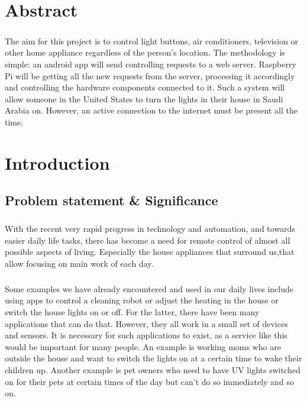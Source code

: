 \documentclass[12pt, oneside, a4paper]{book}
\newcommand{\mychapter}[1]{\newpage%
	\thispagestyle{empty}
	\topskip0pt%
	\vspace*{\fill}%
	\addtocounter{chapter}{1}%
	\begin{center}%
		\textbf{\Large{\color{chapter}{CHAPTER NO. \thechapter \\ \uppercase{#1}}}}%
	\end{center}%
	\vspace*{\fill}%
	\addtocounter{chapter}{-1}
	\newpage%
	\chapter{#1}
}
\begin{document}
	\chapter*{Abstract}
		\label{sec:intro}
		\paragraph{} The aim for this project is to control light buttons, air conditioners, television or other home appliance regardless of the person's location. The methodology is simple: an android app will send controlling requests to a web server. Raspberry Pi will be getting all the new requests from the server, processing it accordingly and controlling the hardware components connected to it. Such a system will allow someone in the United States to turn the lights in their house in Saudi Arabia on. However, an active connection to the internet must be present all the time. 
		
	

	\mychapter{Introduction}
		\section{Problem statement \& Significance}
		\paragraph{}With the recent very rapid progress in technology and automation, and towards easier daily life tasks, there has
		become a need for remote control of almost all possible aspects of living. Especially
		the house appliances that surround us,that allow focusing on main work of each day.
		\paragraph{}Some examples we have already encountered and used in our daily lives include using apps to control a cleaning robot or adjust the heating in the house or switch the house lights on or off. For the latter, there have been many applications that can do that. However, they all work in a small set of devices and sensors. It is necessary for such applications to exist, as a service like this would be important for many people. An example is working moms who are outside the house and want to switch the lights on at a certain time to wake their children up. Another example is pet owners who need to have UV lights switched on for their pets at certain times of the day but can’t do so immediately and so on. 
\end{document}
